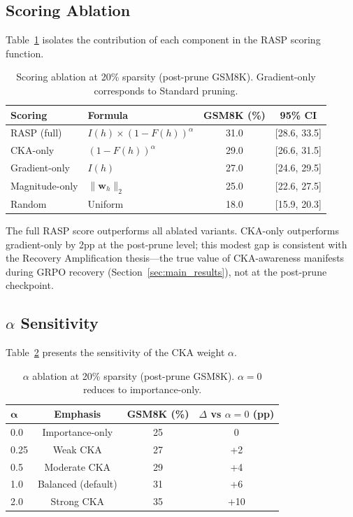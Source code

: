 \documentclass[11pt,a4paper]{article}
\newcommand{\method}{RASP}
\newcommand{\importance}{I(h)}
\newcommand{\overlap}{F(h)}
\begin{document}
\subsection{Scoring Ablation}
\label{sec:ablation}

Table~\ref{tab:ablation} isolates the contribution of each component in the \method{} scoring function.

\begin{table}[t]
\centering
\small
\caption{Scoring ablation at 20\% sparsity (post-prune GSM8K). Gradient-only corresponds to Standard pruning.}
\label{tab:ablation}
\begin{tabular}{llcc}
\toprule
\textbf{Scoring} & \textbf{Formula} & \textbf{GSM8K (\%)} & \textbf{95\% CI} \\
\midrule
\method{} (full) & $\importance{} \times (1{-}\overlap{})^\alpha$ & 31.0 & [28.6, 33.5] \\
CKA-only & $(1{-}\overlap{})^\alpha$ & 29.0 & [26.6, 31.5] \\
Gradient-only & $\importance{}$ & 27.0 & [24.6, 29.5] \\
Magnitude-only & $\|\mathbf{w}_h\|_2$ & 25.0 & [22.6, 27.5] \\
Random & Uniform & 18.0 & [15.9, 20.3] \\
\bottomrule
\end{tabular}
\end{table}

The full \method{} score outperforms all ablated variants. CKA-only outperforms gradient-only by 2pp at the post-prune level; this modest gap is consistent with the Recovery Amplification thesis---the true value of CKA-awareness manifests during GRPO recovery (Section~\ref{sec:main_results}), not at the post-prune checkpoint.

\subsection{$\alpha$ Sensitivity}
\label{sec:alpha}

Table~\ref{tab:alpha} presents the sensitivity of the CKA weight $\alpha$.

\begin{table}[t]
\centering
\small
\caption{$\alpha$ ablation at 20\% sparsity (post-prune GSM8K). $\alpha = 0$ reduces to importance-only.}
\label{tab:alpha}
\begin{tabular}{lccc}
\toprule
$\boldsymbol{\alpha}$ & \textbf{Emphasis} & \textbf{GSM8K (\%)} & \textbf{$\Delta$ vs $\alpha{=}0$ (pp)} \\
\midrule
0.0 & Importance-only & 25 & 0 \\
0.25 & Weak CKA & 27 & +2 \\
0.5 & Moderate CKA & 29 & +4 \\
1.0 & Balanced (default) & 31 & +6 \\
2.0 & Strong CKA & 35 & +10 \\
\bottomrule
\end{tabular}
\end{table}
\end{document}
